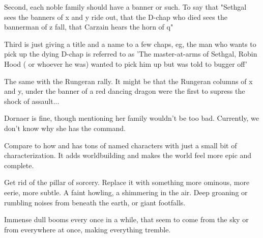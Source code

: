 \begin{changes}
{      Second, each noble family should have a banner or such. To say that "Sethgal sees the banners of x and y ride out, that the D-chap who died sees the bannerman of z fall, that Carzain hears the horn of q"
      
      Third is just giving a title and a name to a few chaps, eg, the man who wants to pick up the dying D-chap is referred to as 'The master-at-arms of Sethgal, Robin Hood ( or whoever he was) wanted to pick him up but was told to bugger off'
      
      The same with the Rungeran rally. 
      It might be that the Rungeran columns of x and y, under the banner of a red dancing dragon were the first to supress the shock of assault...
      
      Dornaer is fine, though mentioning her family wouldn't be too bad. Currently, we don't know why she has the command.}
      
      Compare to how \cite{Homer:Iliad} and \cite{GeorgeRRMartin:ASongofIceandFire} has tons of named characters with just a small bit of characterization.
      It adds worldbuilding and makes the world feel more epic and complete. 
    
    
  \begin{comment}
    \paragraph{The Power of \EreshKal}
  \end{comment}
    Get rid of the pillar of sorcery.
    Replace it with something more ominous, more eerie, more subtle.
    A faint howling, a shimmering in the air.
    Deep groaning or rumbling noises from beneath the earth, or giant footfalls.
    
    Immense dull booms every once in a while, that seem to come from the sky or from everywhere at once, making everything tremble.
\end{changes}









